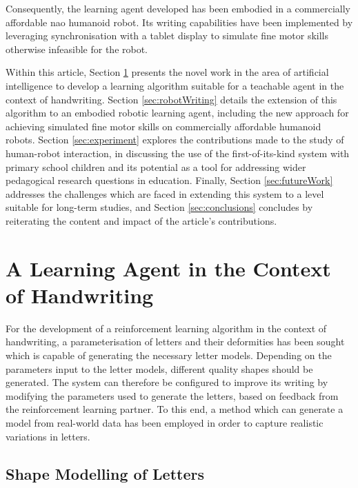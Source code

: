 \documentclass{sig-alternate}
\begin{document}
Consequently, the learning agent developed has been embodied in a commercially
affordable {\sc nao} humanoid robot. Its writing capabilities have been implemented by
leveraging synchronisation with a tablet display to simulate fine motor skills
otherwise infeasible for the robot. 

Within this article, Section \ref{sec:learningAlgorithm} presents the novel work in the area of
artificial intelligence to develop a learning algorithm suitable for a teachable
agent in the context of handwriting. Section \ref{sec:robotWriting} details the
extension of this algorithm to an embodied robotic learning agent, including the
new approach for achieving simulated fine motor skills on commercially
affordable humanoid robots.  Section \ref{sec:experiment} explores the 
contributions made to the study of human-robot interaction, in discussing the
use of the first-of-its-kind system with primary school children and its potential as a tool for
addressing wider pedagogical research questions in education. Finally, Section \ref{sec:futureWork} addresses the challenges which are faced in extending this system to a level suitable for long-term studies, and Section \ref{sec:conclusions} concludes by reiterating the content and impact of the article's contributions.



\section{A Learning Agent in the Context of Handwriting} \label{sec:learningAlgorithm}

For the development of a reinforcement learning algorithm in the context of
handwriting, a parameterisation of letters and their deformities has been sought
which is capable of generating the necessary letter models. Depending on the parameters input to
the letter models, different quality shapes should be generated. The system can
therefore be configured to improve its writing by modifying the parameters used
to generate the letters, based on feedback from the reinforcement learning
partner. To this end, a method which can generate a model from real-world data
has been employed in order to capture realistic variations in letters. 

\subsection{Shape Modelling of Letters} \label{sec:writingGeneration}
\end{document}
